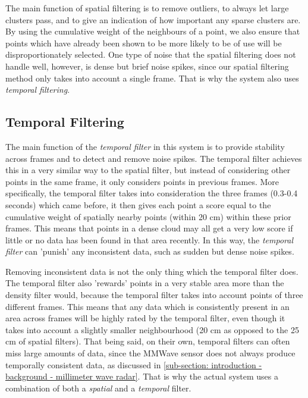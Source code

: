 The main function of spatial filtering is to remove outliers, to always let large clusters pass, and to give an indication of how important any sparse clusters are.
By using the cumulative weight of the neighbours of a point, we also ensure that points which have already been shown to be more likely to be of use will be disproportionately selected.
One type of noise that the spatial filtering does not handle well, however, is dense but brief noise spikes, since our spatial filtering method only takes into account a single frame.
That is why the system also uses \textit{temporal filtering}.



\subsection{Temporal Filtering}
\label{sub-section: tracking method - data filtering - temporal filtering}
The main function of the \textit{temporal filter} in this system is to provide stability across frames and to detect and remove noise spikes.
The temporal filter achieves this in a very similar way to the spatial filter, but instead of considering other points in the same frame, it only considers points in previous frames.
More specifically, the temporal filter takes into consideration the three frames (0.3-0.4 seconds) which came before, it then gives each point a score equal to the cumulative weight of spatially nearby points (within 20 cm) within these prior frames.
This means that points in a dense cloud may all get a very low score if little or no data has been found in that area recently.
In this way, the \textit{temporal filter} can 'punish' any inconsistent data, such as sudden but dense noise spikes.

Removing inconsistent data is not the only thing which the temporal filter does.
The temporal filter also 'rewards' points in a very stable area more than the density filter would, because the temporal filter takes into account points of three different frames.
This means that any data which is consistently present in an area across frames will be highly rated by the temporal filter, even though it takes into account a slightly smaller neighbourhood (20 cm as opposed to the 25 cm of spatial filters).
That being said, on their own, temporal filters can often miss large amounts of data, since the MMWave sensor does not always produce temporally consistent data, as discussed in \cref{sub-section: introduction - background - millimeter wave radar}.
That is why the actual system uses a combination of both a \textit{spatial} and a \textit{temporal} filter.


